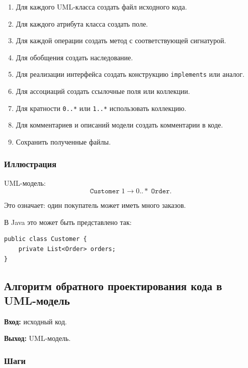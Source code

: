 \documentclass[12pt,a4paper]{article}
\begin{document}
\begin{enumerate}
    \item Для каждого UML-класса создать файл исходного кода.
    \item Для каждого атрибута класса создать поле.
    \item Для каждой операции создать метод с соответствующей сигнатурой.
    \item Для обобщения создать наследование.
    \item Для реализации интерфейса создать конструкцию \texttt{implements} или аналог.
    \item Для ассоциаций создать ссылочные поля или коллекции.
    \item Для кратности \texttt{0..*} или \texttt{1..*} использовать коллекцию.
    \item Для комментариев и описаний модели создать комментарии в коде.
    \item Сохранить полученные файлы.
\end{enumerate}

\subsubsection*{Иллюстрация}

UML-модель:
\[
\texttt{Customer} \; 1 \longrightarrow 0..* \; \texttt{Order}.
\]

Это означает: один покупатель может иметь много заказов.

В Java это может быть представлено так:

\begin{verbatim}
public class Customer {
    private List<Order> orders;
}
\end{verbatim}

\subsection{Алгоритм обратного проектирования кода в UML-модель}

\textbf{Вход:} исходный код.

\textbf{Выход:} UML-модель.

\subsubsection*{Шаги}
\end{document}
